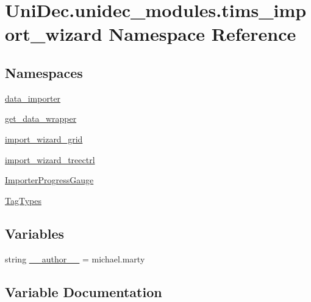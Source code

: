 \hypertarget{namespace_uni_dec_1_1unidec__modules_1_1tims__import__wizard}{}\section{Uni\+Dec.\+unidec\+\_\+modules.\+tims\+\_\+import\+\_\+wizard Namespace Reference}
\label{namespace_uni_dec_1_1unidec__modules_1_1tims__import__wizard}
\subsection*{Namespaces}
\begin{DoxyCompactItemize}
\item 
 \hyperlink{namespace_uni_dec_1_1unidec__modules_1_1tims__import__wizard_1_1data__importer}{data\+\_\+importer}
\item 
 \hyperlink{namespace_uni_dec_1_1unidec__modules_1_1tims__import__wizard_1_1get__data__wrapper}{get\+\_\+data\+\_\+wrapper}
\item 
 \hyperlink{namespace_uni_dec_1_1unidec__modules_1_1tims__import__wizard_1_1import__wizard__grid}{import\+\_\+wizard\+\_\+grid}
\item 
 \hyperlink{namespace_uni_dec_1_1unidec__modules_1_1tims__import__wizard_1_1import__wizard__treectrl}{import\+\_\+wizard\+\_\+treectrl}
\item 
 \hyperlink{namespace_uni_dec_1_1unidec__modules_1_1tims__import__wizard_1_1_importer_progress_gauge}{Importer\+Progress\+Gauge}
\item 
 \hyperlink{namespace_uni_dec_1_1unidec__modules_1_1tims__import__wizard_1_1_tag_types}{Tag\+Types}
\end{DoxyCompactItemize}
\subsection*{Variables}
\begin{DoxyCompactItemize}
\item 
string \hyperlink{namespace_uni_dec_1_1unidec__modules_1_1tims__import__wizard_ab7e64264640c9f199c928a5603beccf6}{\+\_\+\+\_\+author\+\_\+\+\_\+} = \textquotesingle{}michael.\+marty\textquotesingle{}
\end{DoxyCompactItemize}


\subsection{Variable Documentation}
\hypertarget{namespace_uni_dec_1_1unidec__modules_1_1tims__import__wizard_ab7e64264640c9f199c928a5603beccf6}{}

